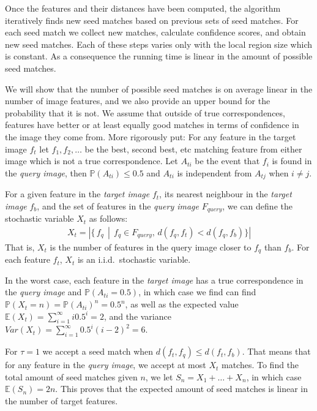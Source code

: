 \documentclass[10pt,twocolumn,letterpaper]{article}
\begin{document}
Once the features and their distances have been computed, the algorithm iteratively finds new seed matches based on previous sets of seed matches. For each seed match we collect new matches, calculate confidence scores, and obtain new seed matches. Each of these steps varies only with the local region size which is constant. As a consequence the running time is linear in the amount of possible seed matches.

We will show that the number of possible seed matches is on average linear in the number of image features, and we also provide an upper bound for the probability that it is not. We assume that outside of true correspondences, features have better or at least equally good matches in terms of confidence in the image they come from. More rigorously put: For any feature in the target image $f_t$ let $f_1, f_2, \ldots$ be the best, second best, etc matching feature from either image which is not a true correspondence. Let $A_{ti}$ be the event that $f_i$ is found in the \emph{query image}, then $\mathbb{P}(A_{ti}) \leq 0.5$ and $A_{ti}$ is independent from $A_{tj}$ when $i \ne j$.

For a given feature in the \emph{target image} $f_t$, its nearest neighbour in the \emph{target image} $f_b$, and the set of features in the \emph{query image} $F_{query}$, we can define the stochastic variable $X_t$ as follows:
\begin{align}
    X_t = \left| \{ \, f_q \, \middle| \, f_q \in F_{query},\, d(f_q, f_t) < d(f_q, f_b) \} \right|
\end{align}
That is, $X_t$ is the number of features in the query image closer to $f_q$ than $f_b$. For each feature $f_t$, $X_t$ is an i.i.d.~stochastic variable. 

In the worst case, each feature in the \emph{target image} has a true correspondence in the \emph{query image} and $\mathbb{P}(A_{ti} = 0.5)$, in which case we find can find $\mathbb{P}(X_t = n) = \mathbb{P}(A_{ti})^n = 0.5^n$, as well as the expected value $\mathbb{E}(X_t) = \sum_{i=1}^\infty i0.5^i = 2$, and the variance $Var(X_t) = \sum_{i=1}^\infty 0.5^i(i - 2)^2 = 6$.

For $\tau = 1$ we accept a seed match when $d(f_t, f_q) \leq d(f_t, f_b)$. That means that for any feature in the \emph{query image}, we accept at most $X_t$ matches. To find the total amount of seed matches given $n$, we let $S_n = X_1 + \ldots + X_n$, in which case $\mathbb{E}(S_n) = 2n$. This proves that the expected amount of seed matches is linear in the number of target features. 
\end{document}
